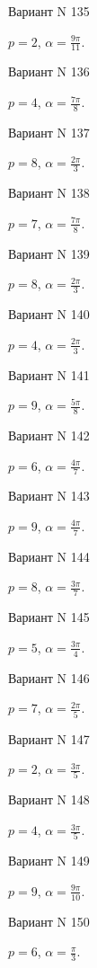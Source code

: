 \documentclass[11pt]{report}
\begin{document}
Вариант N 135

$p = 2$, $\alpha = \frac{9 \pi}{11}$.

Вариант N 136

$p = 4$, $\alpha = \frac{7 \pi}{8}$.

Вариант N 137

$p = 8$, $\alpha = \frac{2 \pi}{3}$.

Вариант N 138

$p = 7$, $\alpha = \frac{7 \pi}{8}$.

Вариант N 139

$p = 8$, $\alpha = \frac{2 \pi}{3}$.

Вариант N 140

$p = 4$, $\alpha = \frac{2 \pi}{3}$.

Вариант N 141

$p = 9$, $\alpha = \frac{5 \pi}{8}$.

Вариант N 142

$p = 6$, $\alpha = \frac{4 \pi}{7}$.

Вариант N 143

$p = 9$, $\alpha = \frac{4 \pi}{7}$.

Вариант N 144

$p = 8$, $\alpha = \frac{3 \pi}{7}$.

Вариант N 145

$p = 5$, $\alpha = \frac{3 \pi}{4}$.

Вариант N 146

$p = 7$, $\alpha = \frac{2 \pi}{5}$.

Вариант N 147

$p = 2$, $\alpha = \frac{3 \pi}{5}$.

Вариант N 148

$p = 4$, $\alpha = \frac{3 \pi}{5}$.

Вариант N 149

$p = 9$, $\alpha = \frac{9 \pi}{10}$.

Вариант N 150

$p = 6$, $\alpha = \frac{\pi}{3}$.
\end{document}
